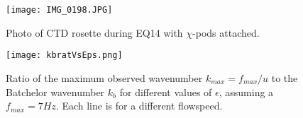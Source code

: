 \documentclass{ametsoc}
\begin{document}
%

%

\graphicspath{
{/Users/Andy/Cruises_Research/ChiPod/ChiPod_Methods_Paper/figures/}
}

\begin{figure}[t]
  \noindent\texttt{[image: IMG\_0198.JPG]}\\
  \caption{Photo of CTD rosette during EQ14 with $\chi$-pods attached.}
  \label{f1}
\end{figure}


\begin{figure}[t]
  \noindent\texttt{[image: kbratVsEps.png]}\\
  \caption{Ratio of the maximum observed wavenumber $k_{max}=f_{max}/u$ to the Batchelor wavenumber $k_b$ for different values of $\epsilon$, assuming a $f_{max}=7Hz$. Each line is for a different flowspeed.}
  \label{kbratVseps}
\end{figure}
\end{document}
